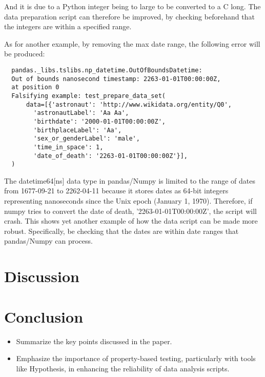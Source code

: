 \documentclass[runningheads]{llncs}
\begin{document}
And it is due to a Python integer being to large to be converted to a C long. The data preparation script can
therefore be improved, by checking beforehand that the integers are within a specified range.

As for another example, by removing the max date range, the following error will be produced:

\begin{verbatim}
  pandas._libs.tslibs.np_datetime.OutOfBoundsDatetime: 
  Out of bounds nanosecond timestamp: 2263-01-01T00:00:00Z, 
  at position 0
  Falsifying example: test_prepare_data_set(
      data=[{'astronaut': 'http://www.wikidata.org/entity/Q0',
        'astronautLabel': 'Aa Aa',
        'birthdate': '2000-01-01T00:00:00Z',
        'birthplaceLabel': 'Aa',
        'sex_or_genderLabel': 'male',
        'time_in_space': 1,
        'date_of_death': '2263-01-01T00:00:00Z'}],
  ) 
\end{verbatim}

The datetime64[ns] data type in pandas/Numpy is limited to the range of dates from 1677-09-21 to 2262-04-11 because it stores dates as 64-bit integers representing nanoseconds since the Unix epoch (January 1, 1970). Therefore, if numpy tries to convert the date of death, '2263-01-01T00:00:00Z', the script will crash.
This shows yet another example of how the data script can be made more robust. Specifically, be checking that the dates are within date ranges that
pandas/Numpy can process.


\section{Discussion}

\section{Conclusion}
\begin{itemize}
  \item Summarize the key points discussed in the paper.
  \item Emphasize the importance of property-based testing, particularly with tools like Hypothesis, in enhancing the reliability of data analysis scripts.
\end{itemize}
%
%
%


\end{document}
